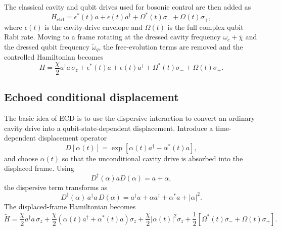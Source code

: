 The classical cavity and qubit drives used for bosonic control are then added as
\begin{equation}
    H_{\mathrm{ctrl}}
    =
    \epsilon^*(t)a
    +
    \epsilon(t)a^\dagger
    +
    \Omega^*(t)\sigma_-
    +
    \Omega(t)\sigma_+,
\end{equation}
where \(\epsilon(t)\) is the cavity-drive envelope and \(\Omega(t)\) is the full complex qubit Rabi rate. Moving to a frame rotating at the dressed cavity frequency \(\omega_c+\bar{\chi}\) and the dressed qubit frequency \(\tilde{\omega}_q\), the free-evolution terms are removed and the controlled Hamiltonian becomes
\begin{equation}
    H
    =
    \frac{\chi}{2}a^\dagger a\,\sigma_z
    +
    \epsilon^*(t)a
    +
    \epsilon(t)a^\dagger
    +
    \Omega^*(t)\sigma_-
    +
    \Omega(t)\sigma_+.
\end{equation}

\subsection{Echoed conditional displacement}

The basic idea of ECD \cite{eickbusch2022ecd,CampagneIbarcq2020} is to use the dispersive interaction to convert an ordinary cavity drive into a qubit-state-dependent displacement. Introduce a time-dependent displacement operator
\begin{equation}
    D[\alpha(t)] = \exp\!\left[\alpha(t)a^\dagger-\alpha^*(t)a\right],
\end{equation}
and choose \(\alpha(t)\) so that the unconditional cavity drive is absorbed into the displaced frame. Using
\begin{equation}
    D^\dagger(\alpha)aD(\alpha) = a+\alpha,
\end{equation}
the dispersive term transforms as
\begin{equation}
    D^\dagger(\alpha)\,
    a^\dagger a\,
    D(\alpha)
    =
    a^\dagger a
    +
    \alpha a^\dagger
    +
    \alpha^* a
    +
    |\alpha|^2.
\end{equation}
The displaced-frame Hamiltonian becomes
\begin{equation}
    \tilde{H}
    =
    \frac{\chi}{2}a^\dagger a\,\sigma_z
    +
    \frac{\chi}{2}
    \left(
        \alpha(t)a^\dagger + \alpha^*(t)a
    \right)\sigma_z
    +
    \frac{\chi}{2}|\alpha(t)|^2 \sigma_z
    +
    \frac{1}{2}
    \left[
        \Omega^*(t)\sigma_-
        +
        \Omega(t)\sigma_+
    \right].
    \label{eq:ecd_displaced}
\end{equation}


